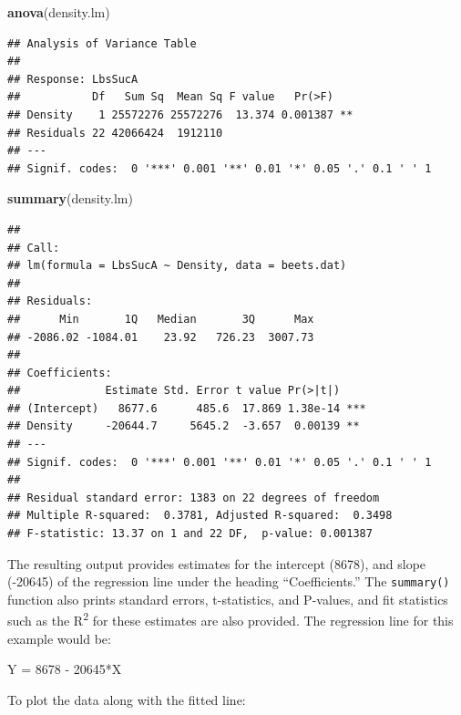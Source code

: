 \documentclass[letterpaper,]{book}
\newenvironment{Shaded}{\begin{snugshade}}{\end{snugshade}}
\newcommand{\KeywordTok}[1]{\textcolor[rgb]{0.13,0.29,0.53}{\textbf{#1}}}
\newcommand{\NormalTok}[1]{#1}
\begin{document}
\begin{Shaded}
\begin{Highlighting}[]
\KeywordTok{anova}\NormalTok{(density.lm)}
\end{Highlighting}
\end{Shaded}

\begin{verbatim}
## Analysis of Variance Table
## 
## Response: LbsSucA
##           Df   Sum Sq  Mean Sq F value   Pr(>F)   
## Density    1 25572276 25572276  13.374 0.001387 **
## Residuals 22 42066424  1912110                    
## ---
## Signif. codes:  0 '***' 0.001 '**' 0.01 '*' 0.05 '.' 0.1 ' ' 1
\end{verbatim}

\begin{Shaded}
\begin{Highlighting}[]
\KeywordTok{summary}\NormalTok{(density.lm)}
\end{Highlighting}
\end{Shaded}

\begin{verbatim}
## 
## Call:
## lm(formula = LbsSucA ~ Density, data = beets.dat)
## 
## Residuals:
##      Min       1Q   Median       3Q      Max 
## -2086.02 -1084.01    23.92   726.23  3007.73 
## 
## Coefficients:
##             Estimate Std. Error t value Pr(>|t|)    
## (Intercept)   8677.6      485.6  17.869 1.38e-14 ***
## Density     -20644.7     5645.2  -3.657  0.00139 ** 
## ---
## Signif. codes:  0 '***' 0.001 '**' 0.01 '*' 0.05 '.' 0.1 ' ' 1
## 
## Residual standard error: 1383 on 22 degrees of freedom
## Multiple R-squared:  0.3781, Adjusted R-squared:  0.3498 
## F-statistic: 13.37 on 1 and 22 DF,  p-value: 0.001387
\end{verbatim}

The resulting output provides estimates for the intercept (8678), and slope (-20645) of the regression line under the heading ``Coefficients.'' The \texttt{summary()} function also prints standard errors, t-statistics, and P-values, and fit statistics such as the R\textsuperscript{2} for these estimates are also provided. The regression line for this example would be:

Y = 8678 - 20645*X

To plot the data along with the fitted line:
\end{document}
